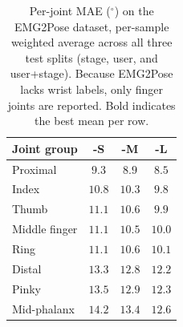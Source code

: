 \begin{table}[h]
\centering
\caption{Per-joint MAE ($^\circ$) on the EMG2Pose dataset, per-sample weighted average across all three test splits (stage, user, and user+stage). Because EMG2Pose lacks wrist labels, only finger joints are reported. Bold indicates the best mean per row.}
\label{tab:per_joint_emg2pose}
\footnotesize
\setlength{\tabcolsep}{3.5pt}
\renewcommand{\arraystretch}{1.05}
\begin{tabular}{lccc}
\toprule
Joint group & \model{}-S & \model{}-M & \model{}-L \\
\midrule
Proximal & $9.3$ & $8.9$ & $\mathbf{8.5}$ \\
Index & $10.8$ & $10.3$ & $\mathbf{9.8}$ \\
Thumb & $11.1$ & $10.6$ & $\mathbf{9.9}$ \\
Middle finger & $11.1$ & $10.5$ & $\mathbf{10.0}$ \\
Ring & $11.1$ & $10.6$ & $\mathbf{10.1}$ \\
Distal & $13.3$ & $12.8$ & $\mathbf{12.2}$ \\
Pinky & $13.5$ & $12.9$ & $\mathbf{12.3}$ \\
Mid-phalanx & $14.2$ & $13.4$ & $\mathbf{12.6}$ \\
\bottomrule
\end{tabular}
\end{table}
